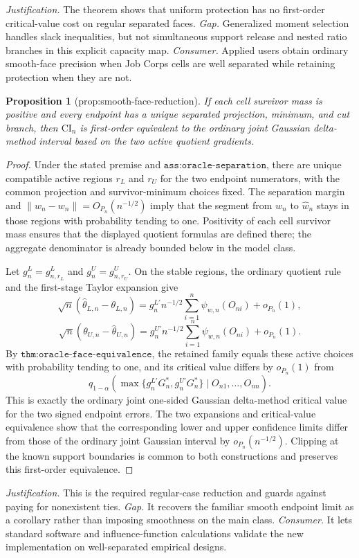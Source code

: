 \documentclass{article}
\newtheorem{proposition}{Proposition}
\begin{document}
\par\smallskip\noindent \textit{Justification.} The theorem shows that uniform protection has no first-order critical-value cost on regular separated faces. \textit{Gap.} Generalized moment selection handles slack inequalities, but not simultaneous support release and nested ratio branches in this explicit capacity map. \textit{Consumer.} Applied users obtain ordinary smooth-face precision when Job Corps cells are well separated while retaining protection when they are not.

\begin{proposition}[prop:smooth-face-reduction]\label{prop:smooth-face-reduction}
If each cell survivor mass is positive and every endpoint has a unique separated projection, minimum, and cut branch, then \(\mathrm{CI}_n\) is first-order equivalent to the ordinary joint Gaussian delta-method interval based on the two active quotient gradients.
\end{proposition}
\begin{proof}
Under the stated premise and \(\texttt{ass:oracle-separation}\), there are unique compatible active regions \(r_L\) and \(r_U\) for the two endpoint numerators, with the common projection and survivor-minimum choices fixed. The separation margin and
\(\lVert\widehat w_n-w_n\rVert=O_{P_n}(n^{-1/2})\) imply that the segment from \(w_n\) to \(\widehat w_n\) stays in those regions with probability tending to one. Positivity of each cell survivor mass ensures that the displayed quotient formulas are defined there; the aggregate denominator is already bounded below in the model class.

Let \(g_n^L=g^L_{n,r_L}\) and \(g_n^U=g^U_{n,r_U}\). On the stable regions, the ordinary quotient rule and the first-stage Taylor expansion give
\[
 \sqrt n(\widehat\theta_{L,n}-\theta_{L,n})
 =g_n^{L\prime}n^{-1/2}\sum_{i=1}^n\psi_{w,n}(O_{ni})+o_{P_n}(1),
\]
\[
 \sqrt n(\theta_{U,n}-\widehat\theta_{U,n})
 =g_n^{U\prime}n^{-1/2}\sum_{i=1}^n\psi_{w,n}(O_{ni})+o_{P_n}(1).
\]
By \(\texttt{thm:oracle-face-equivalence}\), the retained family equals these active choices with probability tending to one, and its critical value differs by \(o_{P_n}(1)\) from
\[
 q_{1-\alpha}\!\left(
 \max\{g_n^{L\prime}G_n^*,g_n^{U\prime}G_n^*\}
 \mid O_{n1},\ldots,O_{nn}\right).
\]
This is exactly the ordinary joint one-sided Gaussian delta-method critical value for the two signed endpoint errors. The two expansions and critical-value equivalence show that the corresponding lower and upper confidence limits differ from those of the ordinary joint Gaussian interval by \(o_{P_n}(n^{-1/2})\). Clipping at the known support boundaries is common to both constructions and preserves this first-order equivalence.
\end{proof}
\par\smallskip\noindent \textit{Justification.} This is the required regular-case reduction and guards against paying for nonexistent ties. \textit{Gap.} It recovers the familiar smooth endpoint limit as a corollary rather than imposing smoothness on the main class. \textit{Consumer.} It lets standard software and influence-function calculations validate the new implementation on well-separated empirical designs.
\end{document}
